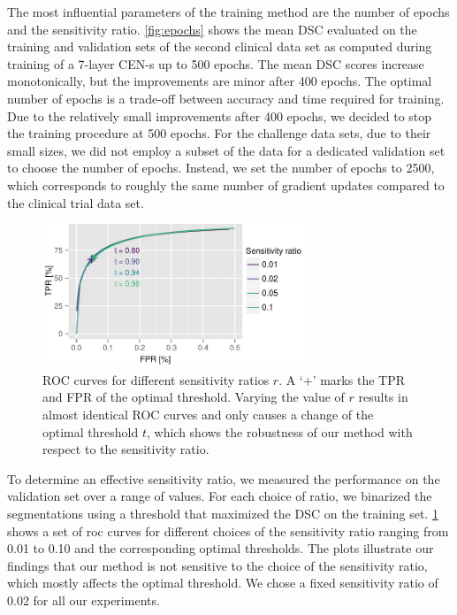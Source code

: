 The most influential parameters of the training method are the number of epochs
and the sensitivity ratio. \ref{fig:epochs} shows the mean DSC evaluated on
the training and validation sets of the second clinical data set as computed
during training of a \mbox{7-layer} CEN-s up to 500 epochs.
The mean DSC scores increase monotonically, but the improvements are minor after
400 epochs. The optimal number of epochs is a trade-off between accuracy and
time required for training. Due to the relatively small improvements after 400
epochs, we decided to stop the training procedure at 500 epochs. For the
challenge data sets, due to their small sizes, we did not employ a subset of the
data for a dedicated validation set to choose the number of epochs. Instead, we
set the number of epochs to 2500, which corresponds to roughly the same number
of gradient updates compared to the clinical trial data set.

\begin{figure}[tb]
\centering
\includegraphics[width=0.7\textwidth]{figures/tmi/roc2}
\caption[ROC curves for different sensitivity ratios $r$]{ROC curves for
different sensitivity ratios $r$. A `$+$' marks the TPR and FPR of the optimal
threshold. Varying the value of $r$ results in almost identical ROC curves and
only causes a change of the optimal threshold $t$, which shows the robustness of
our method with respect to the sensitivity ratio.}
\label{fig:ratio}
\end{figure}

To determine an effective sensitivity ratio, we measured the performance on the
validation set over a range of values. For each choice of ratio, we binarized
the segmentations using a threshold that maximized the DSC on the training set.
\ref{fig:ratio} shows a set of \gls{roc} curves for different choices of the
sensitivity ratio ranging from 0.01 to 0.10 and the corresponding optimal
thresholds. The plots illustrate our findings that our method is not sensitive
to the choice of the sensitivity ratio, which mostly affects the optimal
threshold. We chose a fixed sensitivity ratio of 0.02 for all our experiments.


